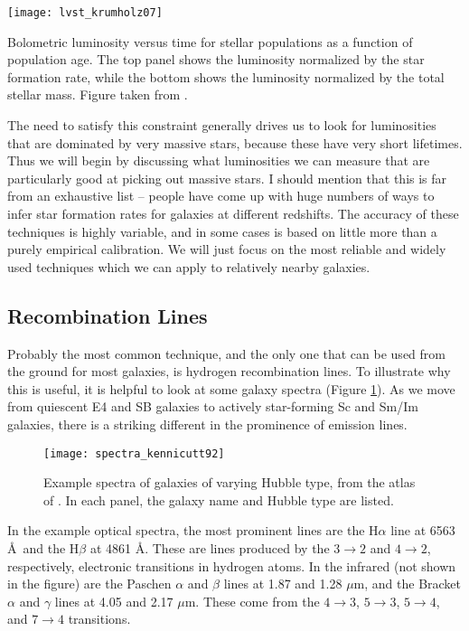 \begin{marginfigure}
\texttt{[image: lvst\_krumholz07]}
\caption[Bolometric luminosity versus stellar population age]{
\label{fig:lvst_krumholz07}
Bolometric luminosity versus time for stellar populations as a function of population age. The top panel shows the luminosity normalized by the star formation rate, while the bottom shows the luminosity normalized by the total stellar mass. Figure taken from \citet{krumholz07e}.
}
\end{marginfigure}

The need to satisfy this constraint generally drives us to look for luminosities that are dominated by very massive stars, because these have very short lifetimes. Thus we will begin by discussing what luminosities we can measure that are particularly good at picking out massive stars. I should mention that this is far from an exhaustive list -- people have come up with huge numbers of ways to infer star formation rates for galaxies at different redshifts. The accuracy of these techniques is highly variable, and in some cases is based on little more than a purely empirical calibration. We will just focus on the most reliable and widely used techniques which we can apply to relatively nearby galaxies.

\subsection{Recombination Lines}

Probably the most common technique, and the only one that can be used from the ground for most galaxies, is hydrogen recombination lines. To illustrate why this is useful, it is helpful to look at some galaxy spectra (Figure \ref{fig:spectra_kennicutt92}). As we move from quiescent E4 and SB galaxies to actively star-forming Sc and Sm/Im galaxies, there is a striking different in the prominence of emission lines.

\begin{figure}
\texttt{[image: spectra\_kennicutt92]}
\caption[Optical spectra of galaxies across the Hubble sequence]{
\label{fig:spectra_kennicutt92}
Example spectra of galaxies of varying Hubble type, from the atlas of \citet{kennicutt92a}. In each panel, the galaxy name and Hubble type are listed.
}
\end{figure}

In the example optical spectra, the most prominent lines are the H$\alpha$ line at 6563 \AA\ and the H$\beta$ at 4861 \AA. These are lines produced by the $3\rightarrow 2$ and $4\rightarrow 2$, respectively, electronic transitions in hydrogen atoms. In the infrared (not shown in the figure) are the Paschen $\alpha$ and $\beta$ lines at 1.87 and 1.28 $\mu$m, and the Bracket $\alpha$ and $\gamma$ lines at 4.05 and 2.17 $\mu$m. These come from the $4\rightarrow 3$, $5\rightarrow 3$, $5\rightarrow 4$, and $7\rightarrow 4$ transitions.

